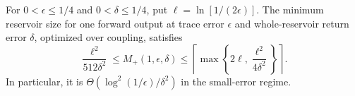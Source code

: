 \begin{corollary}\label{cor:singlecost}
For $0<\epsilon\le1/4$ and $0<\delta\le1/4$, put $\ell=\ln[1/(2\epsilon)]$. The minimum reservoir size for one forward output at trace error $\epsilon$ and whole-reservoir return error $\delta$, optimized over coupling, satisfies
\begin{equation}
 \frac{\ell^2}{512\delta^2}
 \le M_+(1,\epsilon,\delta)
 \le \left\lceil\max\left\{2\ell,\frac{\ell^2}{4\delta^2}\right\}\right\rceil.
 \label{eq:singlecost}
\end{equation}
In particular, it is $\Theta(\log^2(1/\epsilon)/\delta^2)$ in the small-error regime.
\end{corollary}
